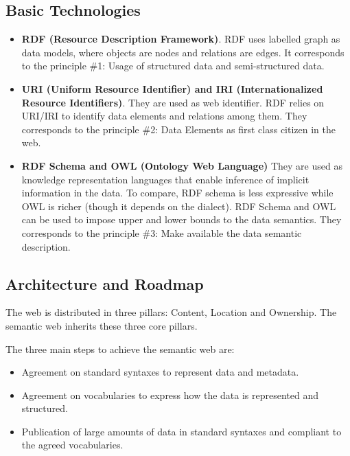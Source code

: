 \documentclass{article}
\theoremstyle{definition}
\begin{document}
\subsection{Basic Technologies}

\begin{itemize}

\item \textbf{RDF (Resource Description Framework)}. RDF uses labelled graph as data models, where objects are nodes and relations are edges. It corresponds to the principle \#1: Usage of structured data and semi-structured data.

\item \textbf{URI (Uniform Resource Identifier) and IRI (Internationalized Resource Identifiers)}. They are used as web identifier. RDF relies on URI/IRI to identify data elements and relations among them. They corresponds to the principle \#2: Data Elements as first class citizen in the web.

\item \textbf{RDF Schema and OWL (Ontology Web Language)} They are used as knowledge representation languages that enable inference of implicit information in the data. To compare, RDF schema is less expressive while OWL is richer (though it depends on the dialect). RDF Schema and OWL can be used to impose upper and lower bounds to the data semantics. They corresponds to the principle \#3: Make available the data semantic description.

\end{itemize}

\subsection{Architecture and Roadmap}

The web is distributed in three pillars: Content, Location and Ownership. The semantic web inherits these three core pillars.

The three main steps to achieve the semantic web are: 
\begin{itemize}
    \item Agreement on standard syntaxes to represent data and metadata.
    \item Agreement on vocabularies to express how the data is represented and structured.
    \item Publication of large amounts of data in standard syntaxes and compliant to the agreed vocabularies.
\end{itemize}
\end{document}
